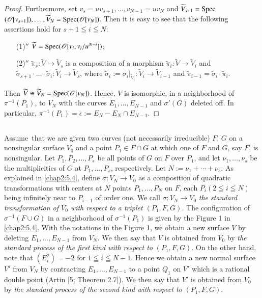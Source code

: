 \begin{proof}
Furthermore, set $v_{s}=uv_{s+1},\ldots,v_{N-1}=uv_{N}$ and
$\widetilde{V}_{s+1}=\operatorname{Spec}$ $(\mathscr{O}[v_{s+1}]),\ldots,
\widetilde{V}_{N} =\operatorname{Spec} (\mathscr{O}[v_{N}])$. Then
it is easy to see that the following assertions hold for $s+1\leqq
i\leqq N$:
\begin{itemize}
\item[(1)$''$]
  $\widetilde{V}=\operatorname{Spec}(\mathscr{O}[v_{i},v_{i}/u^{N-i}])$;

\item[(2)$''$] $\widetilde{\pi}_{s}:\widetilde{V}\to
  \widetilde{V}_{s}$ is a composition of a morphism
  $\widetilde{\pi}_{i}:\widetilde{V}\to \widetilde{V}_{i}$ and
  $\widetilde{\sigma}_{s+1}\cdot\ldots\cdot\widetilde{\sigma}_{i}:\widetilde{V}_{i}\to
  \widetilde{V}_{s}$, where
  $\widetilde{\sigma}_{i}:=\sigma_{i}|_{\widetilde{V}_{i}}:\widetilde{V}_{i}\to
  \widetilde{V}_{i-1}$ and
  $\widetilde{\pi}_{i-1}=\widetilde{\sigma}_{i}\cdot
  \widetilde{\pi}_{i}$. 
\end{itemize}

Then
$\widetilde{V}\cong\widetilde{V}_{N}=\operatorname{Spec}(\mathscr{O}[v_{N}])$. Hence,
$V$ is isomorphic, in a neighborhood of $\pi^{-1}(P_{1})$, to $V_{N}$
with the curves $E_{1},\ldots,E_{N-1}$ and $\sigma'(G)$ deleted
off. In particular, $\pi^{-1}(P_{1})=\epsilon:=E_{N}-E_{N}\cap
E_{N-1}$.
\end{proof}

\subsection{}\label{chap2:5.6}
Assume\pageoriginale\ that we are given two curves (not necessarily
irreducible) $F$, $G$ on a nonsingular surface $V_{0}$ and a point
$P_{1}\in F\cap G$ at which one of $F$ and $G$, say $F$, is
nonsingular. Let $P_{1},P_{2},\ldots,P_{s}$ be all points of $G$ on
$F$ over $P_{1}$, and let $\nu_{1},\ldots,\nu_{s}$ be the
multiplicities of $G$ at $P_{1},\ldots,P_{s}$, respectively. Let
$N:=\nu_{1}+\cdots+\nu_{s}$. As explained in \ref{chap2:5.4}, define
$\sigma:V_{N}\to V_{0}$ as a composition of quadratic transformations
with centers at $N$ points $P_{1},\ldots,P_{N}$ on $F$, each
$P_{i}(2\leqq i\leqq N)$ being infinitely near to $P_{i-1}$ of order
one. We call $\sigma:V_{N}\to V_{0}$ {\em the standard transformation
  of $V_{0}$ with respect to a triplet $(P_{1},F,G)$.} The
configuration of $\sigma^{-1}(F\cup G)$ in a neighborhood of
$\sigma^{-1}(P_{1})$ is given by the Figure 1 in \ref{chap2:5.4}. With the
notations in the Figure 1, we obtain a new surface $V$ by deleting
$E_{1},\ldots,E_{N-1}$ from $V_{N}$. We then say that $V$ is obtained
from $V_{0}$ by {\em the standard process of the first kind with
  respect to} $(P_{1},F,G)$. On the other hand, note that
$(E^{2}_{i})=-2$ for $1\leqq i\leqq N-1$. Hence we obtain a new normal
surface $V'$ from $V_{N}$ by contracting $E_{1},\ldots,E_{N-1}$ to a
point $Q_{1}$ on $V'$ which is a rational double point (\cf Artin [5;
  Theorem 2.7]). We then say that $V'$ is obtained from
$V_{0}$ by {\em the standard process of the second kind with respect
  to} $(P_{1},F,G)$.

